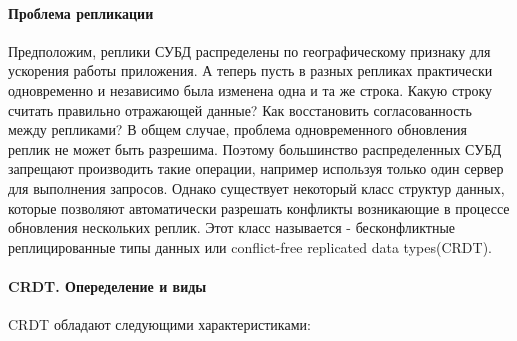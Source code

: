 \paragraph{Проблема репликации}

Предположим, реплики СУБД распределены по географическому признаку для ускорения работы приложения. А теперь пусть в разных репликах практически одновременно и независимо была изменена одна и та же строка. Какую строку считать правильно отражающей данные? Как восстановить согласованность между репликами? В общем случае, проблема одновременного обновления реплик не может быть разрешима. Поэтому большинство распределенных СУБД запрещают производить такие операции, например используя только один сервер для выполнения запросов. Однако существует некоторый класс структур данных, которые позволяют автоматически разрешать конфликты возникающие в процессе обновления нескольких реплик. Этот класс называется - бесконфликтные реплицированные типы данных или conflict-free replicated data types(CRDT). 

\paragraph{CRDT. Опеределение и виды}

CRDT обладают следующими характеристиками:

